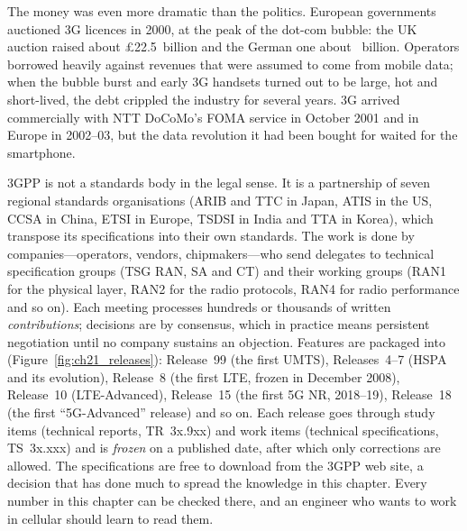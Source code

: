 The money was even more dramatic than the politics. European governments auctioned 3G licences in
2000, at the peak of the dot-com bubble: the UK auction raised about \pounds22.5~billion and the
German one about ~billion. Operators borrowed heavily against revenues that were assumed
to come from mobile data; when the bubble burst and early 3G handsets turned out to be large, hot and
short-lived, the debt crippled the industry for several years. 3G arrived commercially with NTT
DoCoMo's FOMA service in October 2001 and in Europe in 2002--03, but the data revolution it had been
bought for waited for the smartphone.


\begin{history}
3GPP is not a standards body in the legal sense. It is a partnership of seven regional standards
organisations (ARIB and TTC in Japan, ATIS in the US, CCSA in China, ETSI in Europe, TSDSI in India
and TTA in Korea), which transpose its specifications into their own standards. The work is done by
companies---operators, vendors, chipmakers---who send delegates to technical specification groups
(TSG RAN, SA and CT) and their working groups (RAN1 for the physical layer, RAN2 for the radio
protocols, RAN4 for radio performance and so on). Each meeting processes hundreds or thousands of
written \emph{contributions}; decisions are by consensus, which in practice means persistent
negotiation until no company sustains an objection. Features are packaged into 
(Figure~\ref{fig:ch21_releases}): Release~99 (the first UMTS), Releases~4--7 (HSPA and its
evolution), Release~8 (the first LTE, frozen in December 2008), Release~10 (LTE-Advanced),
Release~15 (the first 5G NR, 2018--19), Release~18 (the first ``5G-Advanced'' release) and so on.
Each release goes through study items (technical reports, TR~3x.9xx) and work items (technical
specifications, TS~3x.xxx) and is \emph{frozen} on a published date, after which only corrections
are allowed. The specifications are free to download from the 3GPP web site, a decision that has
done much to spread the knowledge in this chapter. Every number in this chapter can be checked
there, and an engineer who wants to work in cellular should learn to read them.
\end{history}


